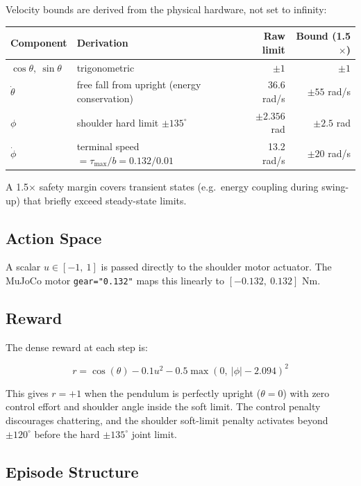 \documentclass[12pt,a4paper]{article}
\begin{document}
Velocity bounds are derived from the physical hardware, not set to infinity:

\begin{center}
\begin{tabular}{llrr}
\toprule
\textbf{Component} & \textbf{Derivation} & \textbf{Raw limit} & \textbf{Bound (1.5$\times$)} \\
\midrule
$\cos\theta,\ \sin\theta$ & trigonometric & $\pm 1$ & $\pm 1$ \\
$\dot\theta$ & free fall from upright (energy conservation) & 36.6 rad/s & $\pm 55$ rad/s \\
$\phi$ & shoulder hard limit $\pm135^\circ$ & $\pm2.356$ rad & $\pm2.5$ rad \\
$\dot\phi$ & terminal speed $= \tau_{\max}/b = 0.132/0.01$ & 13.2 rad/s & $\pm20$ rad/s \\
\bottomrule
\end{tabular}
\end{center}

\noindent A 1.5$\times$ safety margin covers transient states (e.g.\ energy coupling
during swing-up) that briefly exceed steady-state limits.

\subsection{Action Space}

A scalar $u \in [-1,\ 1]$ is passed directly to the shoulder motor actuator.
The MuJoCo motor \texttt{gear="0.132"} maps this linearly to
$[-0.132,\ 0.132]$ Nm.

\subsection{Reward}

The dense reward at each step is:

\begin{equation}
r = \cos(\theta) - 0.1u^2 - 0.5\max(0,\ |\phi|-2.094)^2
\end{equation}

\noindent This gives $r = +1$ when the pendulum is perfectly upright ($\theta = 0$)
with zero control effort and shoulder angle inside the soft limit.  The
control penalty discourages chattering, and the shoulder soft-limit penalty
activates beyond $\pm120^\circ$ before the hard $\pm135^\circ$ joint limit.

\subsection{Episode Structure}
\end{document}
